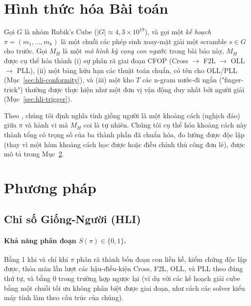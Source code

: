 \documentclass[10pt,conference]{article}
\begin{document}
\section{Hình thức hóa Bài toán}
\label{sec:formalization}

Gọi $G$ là nhóm Rubik's Cube ($|G| \approx 4,3 \times 10^{19}$), và gọi
một \emph{kế hoạch} $\pi = (m_1, \ldots, m_k)$ là một chuỗi các phép
sinh xoay-mặt giải một scramble $s \in G$ cho trước. Gọi $M_H$ là một
\emph{mô hình kỳ vọng con người}: trong bài báo này, $M_H$ được cụ thể
hóa thành (i) sự phân rã giai đoạn CFOP (Cross $\to$ F2L $\to$ OLL
$\to$ PLL), (ii) một bảng hữu hạn các thuật toán chuẩn, có tên cho
OLL/PLL (Mục~\ref{sec:hli-conformity}), và (iii) một kho $T$ các n-gram
nước-đi ngắn ("finger-trick") thường được thực hiện như một đơn vị vận
động duy nhất bởi người giải (Mục~\ref{sec:hli-trigger}).

Theo \citet{kulkarni2016}, chúng tôi định nghĩa tính giống người là một
khoảng cách (nghịch đảo) giữa $\pi$ và hành vi mà $M_H$ coi là tự
nhiên. Chúng tôi cụ thể hóa khoảng cách này thành tổng có trọng số của
ba thành phần đã chuẩn hóa, đo lường được độc lập (thay vì một hàm
khoảng cách học được hoặc điều chỉnh thủ công đơn lẻ), được mô tả trong
Mục~\ref{sec:method}.

\section{Phương pháp}
\label{sec:method}

\subsection{Chỉ số Giống-Người (HLI)}

\paragraph{Khả năng phân đoạn $S(\pi) \in \{0,1\}$.}
Bằng 1 khi và chỉ khi $\pi$ phân rã thành bốn đoạn con liền kề, kiểm
chứng độc lập được, thỏa mãn lần lượt các hậu-điều-kiện Cross, F2L,
OLL, và PLL theo đúng thứ tự, và bằng 0 trong trường hợp ngược lại (ví
dụ với các kế hoạch giải cube bằng một chuỗi tối ưu không phân biệt
được giai đoạn, như cách các solver kiểu máy tính làm theo cấu trúc của
chúng).
\end{document}
